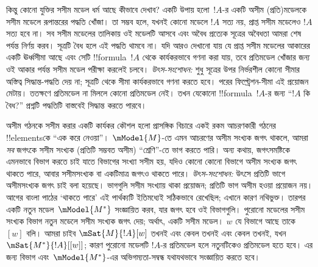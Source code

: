\documentclass[../../../include/open-logic-section]{subfiles}
\begin{document}
কিন্তু কোনো যুক্তির সসীম মডেল ধর্ম আছে কীভাবে দেখাব? একটি উপায় হলো~$!A$-র একটি অসীম (প্রতি)মডেলকে সসীম মডেলে রূপান্তরের পদ্ধতি খোঁজা। তা সম্ভব হলে, যখনই কোনো মডেলে $!A$ সত্য নয়, প্রাপ্ত সসীম মডেলেও $!A$ সত্য হবে না। সব সসীম মডেলের তালিকায় ওই মডেলটি আসবে এবং অবৈধ প্রত্যেক সূত্রের অবৈধতা আমরা শেষ পর্যন্ত নির্ণয় করব। সূত্রটি বৈধ হলে এই পদ্ধতি থামবে না। যদি আরও দেখানো যায় যে প্রাপ্ত সসীম মডেলের আকারের একটি ঊর্ধ্বসীমা আছে এবং সেটি !!{formula}~$!A$ থেকে কার্যকরভাবে গণনা করা যায়, তবে প্রতিমডেল খোঁজার জন্য ওই আকার পর্যন্ত সসীম মডেল পরীক্ষা করলেই চলবে।
\emph{উৎস-সংশোধন:} শুধু সূত্রের উপর নির্ভরশীল কোনো সীমার অস্তিত্ব সিদ্ধান্ত-পদ্ধতি দেয় না; সূত্রটি থেকে সীমা কার্যকরভাবে গণনা করতে হবে। পরের ফিল্ট্রেশন-সীমা এই প্রয়োজন মেটায়।
ততক্ষণে প্রতিমডেল না মিললে কোনো প্রতিমডেল নেই। তখন যেকোনো !!{formula}~$!A$-র জন্য “$!A$ কি বৈধ?” প্রশ্নটি পদ্ধতিটি বাস্তবেই সিদ্ধান্ত করতে পারবে।

অসীম গঠনকে সসীম করার একটি কার্যকর কৌশল হলো প্রাসঙ্গিক বিচারে একই রকম আচরণকারী গঠনের !!{element}sকে “এক করে নেওয়া”। $\mModel{M}$-তে এমন আচরণের অসীম সংখ্যক জগৎ থাকলে, আমরা \emph{সব} জগৎকে সসীম সংখ্যক (প্রতিটি সম্ভবত অসীম) “শ্রেণি”-তে ভাগ করতে পারি। অন্য কথায়, জগৎসমষ্টিকে এমনভাবে বিভাগ করতে চাই যাতে বিভাগের সংখ্যা সসীম হয়, যদিও কোনো কোনো বিভাগে অসীম সংখ্যক জগৎ থাকতে পারে, আবার সসীমসংখ্যক বা একটিমাত্র জগৎও থাকতে পারে।
\emph{উৎস-সংশোধন:} উৎসে প্রতিটি ভাগে অসীমসংখ্যক জগৎ চাই বলা হয়েছে। ভাগগুলি সসীম সংখ্যায় থাকা প্রয়োজন; প্রতিটি ভাগ অসীম হওয়া প্রয়োজন নয়। আগের বাংলা পাঠের ‘থাকতে পারে’ এই পার্থক্যটি ইতিমধ্যেই সঠিকভাবে রেখেছিল; এখানে কারণ নথিভুক্ত।
তারপর একটি নতুন মডেল~$\mModel{M^*}$ সংজ্ঞায়িত করব, যার জগৎ হবে ওই বিভাগগুলি। পুরোনো মডেলের সসীম সংখ্যক বিভাগ নতুন মডেলে সসীম সংখ্যক জগৎ দেয়; অর্থাৎ, একটি সসীম মডেল। $w$ যে বিভাগে আছে তাকে $[w]$ বলি। আমরা চাইব $\mSat{M}{!A}[w]$ তখনই এবং কেবল তখনই এবং কেবল তখনই, যখন $\mSat{M^*}{!A}[{[w]}]$; কারণ পুরোনো মডেলটি $!A$-র প্রতিমডেল হলে নতুনটিকেও প্রতিমডেল হতে হবে। এর জন্য বিভাগ এবং~$\mModel{M^*}$-এর অভিগম্যতা-সম্বন্ধ যথাযথভাবে সংজ্ঞায়িত করতে হবে।
\end{document}
